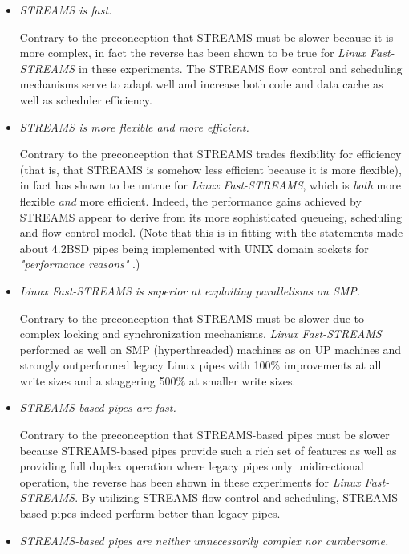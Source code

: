 \documentclass[letterpaper,final,notitlepage,twocolumn,10pt,twoside]{article}
\begin{document}
\begin{itemize}

\item \textit{STREAMS is fast.}

Contrary to the preconception that STREAMS must be slower because it is more complex, in fact the
reverse has been shown to be true for \textsl{Linux Fast-STREAMS} in these experiments.  The STREAMS
flow control and scheduling mechanisms serve to adapt well and increase both code and data cache as
well as scheduler efficiency.

\item \textit{STREAMS is more flexible {\em and} more efficient.}

Contrary to the preconception that STREAMS trades flexibility for efficiency (that is, that STREAMS
is somehow less efficient because it is more flexible), in fact has shown to be untrue for
\textsl{Linux Fast-STREAMS}, which is {\em both} more flexible {\em and} more efficient.  Indeed,
the performance gains achieved by STREAMS appear to derive from its more sophisticated queueing,
scheduling and flow control model. (Note that this is in fitting with the statements made about
4.2BSD pipes being implemented with UNIX domain sockets for \textit{"performance reasons"}
\cite[]{bsd}.)

\item \textit{Linux Fast-STREAMS is superior at exploiting parallelisms on SMP.}

Contrary to the preconception that STREAMS must be slower due to complex locking and synchronization
mechanisms, \textsl{Linux Fast-STREAMS} performed as well on SMP (hyperthreaded) machines as on UP
machines and strongly outperformed legacy Linux pipes with 100\% improvements at all write sizes and
a staggering 500\% at smaller write sizes.

\item \textit{STREAMS-based pipes are fast.}

Contrary to the preconception that STREAMS-based pipes must be slower because STREAMS-based pipes
provide such a rich set of features as well as providing full duplex operation where legacy pipes
only unidirectional operation, the reverse has been shown in these experiments for \textsl{Linux
Fast-STREAMS}.  By utilizing STREAMS flow control and scheduling, STREAMS-based pipes indeed perform
better than legacy pipes.

\item \textit{STREAMS-based pipes are neither unnecessarily complex nor cumbersome.}


\end{itemize}
\end{document}
